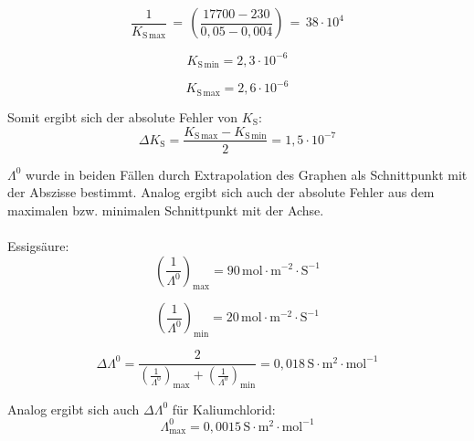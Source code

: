 \documentclass[12pt,a4paper,titlepage,headinclude,bibtotoc]{scrartcl}
\begin{document}
\begin{equation}
\frac{1}{K_{\mathrm{S}\,\mathrm{max}}}\,=\,\left(\frac{17700-230}{0,05-0,004}\right)\,=\, 38 \cdot 10^4
\end{equation}


\begin{equation}
K_{\mathrm{S}\,\mathrm{min}} = 2,3 \cdot 10^{-6}
\end{equation}

\begin{equation}
K_{\mathrm{S}\,\mathrm{max}} = 2,6 \cdot 10^{-6}
\end{equation}


Somit ergibt sich der absolute Fehler von $K_{\mathrm{S}}$:\\

\begin{equation}
\Delta K_{\mathrm{S}} = \frac{K_{\mathrm{S}\,\mathrm{max}} - K_{\mathrm{S}\,\mathrm{min}}}{2} = 1,5 \cdot 10^{-7}
\end{equation}


$\Lambda^0$ wurde in beiden Fällen durch Extrapolation des Graphen als Schnittpunkt mit der Abszisse bestimmt. Analog ergibt sich auch der absolute Fehler aus dem maximalen bzw. minimalen Schnittpunkt mit der Achse. \\
\\
Essigsäure:\\

\begin{equation}
\left(\frac{1}{\Lambda^0}\right)_\mathrm{max} = 90\, \mathrm{mol \cdot m^{-2} \cdot S^{-1}}
\end{equation}

\begin{equation}
\left(\frac{1}{\Lambda^0}\right)_\mathrm{min} = 20\, \mathrm{mol \cdot m^{-2} \cdot S^{-1}}
\end{equation}

\begin{equation}
\Delta \Lambda^0 = \frac{2}{(\frac{1}{\Lambda^0})_\mathrm{max} + (\frac{1}{\Lambda^0})_\mathrm{min}} = 0,018\, \mathrm{S \cdot m^2 \cdot mol^{-1}}
\end{equation}

Analog ergibt sich auch $\Delta \Lambda^0$ für Kaliumchlorid:\\

\begin{equation}
\Lambda^0_\mathrm{max} = 0,0015\, \mathrm{S \cdot m^{2} \cdot mol^{-1}} 
\end{equation}
\end{document}
